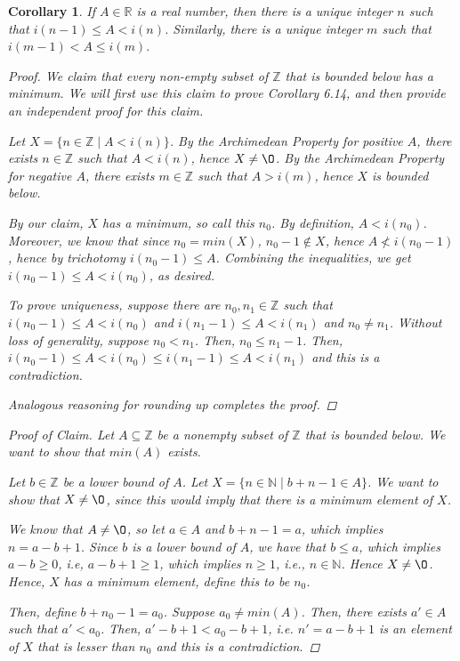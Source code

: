\documentclass[11pt]{article}
\newcommand{\bbN}{\mathbb{N}}
\newcommand{\bbR}{\mathbb{R}}
\newcommand{\bbZ}{\mathbb{Z}}
\renewcommand{\emptyset}{\O}
\newtheorem{corollary}[theorem]{Corollary}
\theoremstyle{definition}
\numberwithin{equation}{subsection}
\begin{document}
\begin{corollary}
	If $A \in \bbR$ is a real number, then there is a unique  integer $n$ such that $i(n-1) \leq A<i(n)$. Similarly, there is a unique integer $m$ such that $i(m-1)<A\leq i(m).$ 

\begin{proof}
We claim that every non-empty subset of $\bbZ$ that is bounded below has a minimum. We will first use this claim to prove Corollary 6.14, and then provide an independent proof for this claim.

Let $X = \{n \in \bbZ \mid A<i(n)\}$. By the Archimedean Property for positive $A$, there exists $n \in \bbZ$ such that $A < i(n)$, hence $X \neq \emptyset$. By the Archimedean Property for negative $A$, there exists $m \in \bbZ$ such that $A > i(m)$, hence $X$ is bounded below.

By our claim, $X$ has a minimum, so call this $n_0$. By definition, $A < i(n_0)$. Moreover, we know that since $n_0 = min(X)$, $n_0 - 1 \notin X$, hence $A \not < i(n_0 -1)$, hence by trichotomy $i(n_0 -1) \leq A$. Combining the inequalities, we get $i(n_0 -1) \leq A<i(n_0)$, as desired.

To prove uniqueness, suppose there are $n_0, n_1 \in \bbZ$ such that $i(n_0 -1) \leq A < i(n_0)$ and $i(n_1 -1) \leq A < i(n_1)$ and $n_0 \neq n_1$. Without loss of generality, suppose $n_0 <n_1$. Then, $n_0 \leq n_1 -1$. Then, $i(n_0 -1) \leq A < i(n_0) \leq i(n_1 -1) \leq A < i(n_1)$ and this is a contradiction. 

Analogous reasoning for rounding up completes the proof.


\renewcommand\qedsymbol{QED}
\end{proof}

\begin{proof}[Proof of Claim]
Let $A \subseteq \bbZ$ be a nonempty subset of $\bbZ$ that is bounded below. We want to show that $min (A)$ exists.

Let $b \in \bbZ$ be a lower bound of $A$. Let $X = \{n \in \bbN \mid b+n-1 \in A\}$. We want to show that $X \neq \emptyset$, since this would imply that there is a minimum element of $X$.

We know that $A \neq \emptyset$, so let $a \in A$ and $b+n-1 = a$, which implies $n = a-b+1$. Since $b$ is a lower bound of $A$, we have that $b \leq a$, which implies $a-b \geq 0$, i.e, $a-b+1\geq 1$, which implies $n \geq 1$, i.e., $n \in \bbN$. Hence $X \neq \emptyset$. Hence, $X$ has a minimum element, define this to be $n_0$.

Then, define $b+n_0-1 = a_0$. Suppose $a_0 \neq min(A)$. Then, there exists $a' \in A$ such that $a' <a_0$. Then, $a' - b +1 < a_0 - b+1$, i.e. $n' = a
-b+1$ is an element of $X$ that is lesser than $n_0$ and this is a contradiction.

\renewcommand\qedsymbol{QED}
\end{proof}

\end{corollary}
\end{document}
